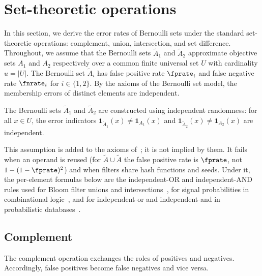 
\section{Set-theoretic operations}
\label{sec:set_theory}
In this section, we derive the error rates of Bernoulli sets under the
standard set-theoretic operations: complement, union, intersection, and set
difference.
Throughout, we assume that the Bernoulli sets $\tilde{A}_1$ and
$\tilde{A}_2$ approximate objective sets $A_1$ and $A_2$ respectively over
a common finite universal set $U$ with cardinality $u = |U|$.
The Bernoulli set $\tilde{A}_i$ has false positive rate $\fprate_i$ and
false negative rate $\fnrate_i$ for $i \in \{1,2\}$.
By the axioms of the Bernoulli set model, the membership errors of distinct
elements are independent.

\begin{assumption}
\label{asm:cross_set_indep}
The Bernoulli sets $\tilde{A}_1$ and $\tilde{A}_2$ are constructed using independent randomness: for all $x \in U$, the error indicators $\mathbf{1}_{\tilde{A}_1}(x) \neq \mathbf{1}_{A_1}(x)$ and $\mathbf{1}_{\tilde{A}_2}(x) \neq \mathbf{1}_{A_2}(x)$ are independent.
\end{assumption}

This assumption is added to the axioms of~\cite{bernoulliSets}; it is not implied by them.
It fails when an operand is reused (for $\tilde{A} \cup \tilde{A}$ the false positive rate is $\fprate$, not $1-(1-\fprate)^2$) and when filters share hash functions and seeds.
Under it, the per-element formulas below are the independent-OR and independent-AND rules used for Bloom filter unions and intersections~\cite{bloom1970,broderMitzenmacher2004}, for signal probabilities in combinational logic~\cite{parker1975,krishnaswamy2008ptm}, and for independent-or and independent-and in probabilistic databases~\cite{dalvi2007}.

\subsection{Complement}
\label{sec:complement}
The complement operation exchanges the roles of positives and negatives.
Accordingly, false positives become false negatives and vice versa.

